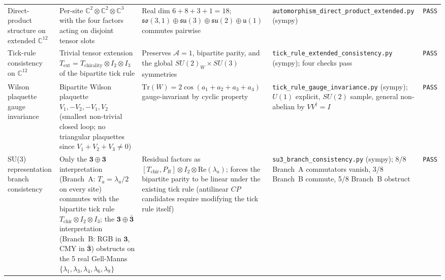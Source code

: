 {\begin{longtable}{@{}p{3.2cm}p{3.6cm}p{3.4cm}p{3.8cm}p{1.0cm}@{}}
Direct-product structure on extended $\mathbb{C}^{12}$
    & Per-site $\mathbb{C}^2 \otimes \mathbb{C}^2 \otimes \mathbb{C}^3$
      with the four factors acting on disjoint tensor slots
    & Real dim $6 + 8 + 3 + 1 = 18$;
      $\mathfrak{so}(3,1) \oplus \mathfrak{su}(3) \oplus
       \mathfrak{su}(2) \oplus \mathfrak{u}(1)$ commutes pairwise
    & \nolinkurl{automorphism_direct_product_extended.py} (sympy)
    & \texttt{PASS} \\

Tick-rule consistency on $\mathbb{C}^{12}$
    & Trivial tensor extension
      $T_\text{ext} = T_\text{chirality} \otimes I_2 \otimes I_3$
      of the bipartite tick rule
    & Preserves $\mathcal{A}=1$, bipartite parity, and the global
      $SU(2)_W \times SU(3)$ symmetries
    & \nolinkurl{tick_rule_extended_consistency.py} (sympy);
      four checks pass
    & \texttt{PASS} \\

Wilson plaquette gauge invariance
    & Bipartite Wilson plaquette
      $V_1, -V_2, -V_1, V_2$ (smallest non-trivial closed loop;
      no triangular plaquettes since $V_1 + V_2 + V_3 \neq 0$)
    & $\mathrm{Tr}(W) = 2\cos(a_1 + a_2 + a_3 + a_4)$
      gauge-invariant by cyclic property
    & \nolinkurl{tick_rule_gauge_invariance.py} (sympy);
      $U(1)$ explicit, $SU(2)$ sample, general non-abelian by
      $V V^\dagger = I$
    & \texttt{PASS} \\

SU(3) representation branch consistency
    & Only the $\mathbf{3} \oplus \mathbf{3}$ interpretation
      (Branch~A: $T_a = \lambda_a / 2$ on every site) commutes
      with the bipartite tick rule
      $T_\text{chir} \otimes I_2 \otimes I_3$; the
      $\mathbf{3} \oplus \bar{\mathbf{3}}$ interpretation
      (Branch~B: RGB in $\mathbf{3}$, CMY in $\bar{\mathbf{3}}$)
      obstructs on the 5 real Gell-Manns
      $\{\lambda_1, \lambda_3, \lambda_4, \lambda_6, \lambda_8\}$
    & Residual factors as $[T_\text{chir}, P_R] \otimes I_2 \otimes
      \mathrm{Re}(\lambda_a)$; forces the bipartite parity to be
      linear under the existing tick rule (antilinear $CP$
      candidates require modifying the tick rule itself)
    & \nolinkurl{su3_branch_consistency.py} (sympy);
      8/8 Branch~A commutators vanish, 3/8 Branch~B commute,
      5/8 Branch~B obstruct
    & \texttt{PASS} \\


\end{longtable}}
